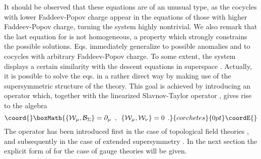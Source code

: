 \documentclass[a4paper,12pt]{article}
\begin{document}
It should be observed that these equations are of an unusual type, as the
cocycles with lower Faddeev-Popov charge appear in the equations of those
with higher Faddeev-Popov charge, turning the system \myHighlight{$\left( \ref{sde}%
\right) $}\coordHE{} highly nontrivial. We also remark that the last equation for \coordHE{} is not homogeneous, a property which
strongly constrains the possible solutions. Eqs.\myHighlight{$\left( \ref{sde}\right) $}\coordHE{}
immediately generalize to possible anomalies and to cocycles with arbitrary
Faddeev-Popov charge. To some extent, the system \myHighlight{$\left( \ref{sde}\right) $}\coordHE{}
displays a certain similarity with the descent equations in \coordHE{} superspace 
\cite{sp}. Actually, it is possible to solve the eqs.\myHighlight{$\left( \ref{sde}%
\right) $}\coordHE{} in a rather direct way by making use of the supersymmetric
structure of the theory. This goal is achieved by introducing an operator \coordHE{} which, together with the linearized Slavnov-Taylor
operator \coordHE{}, gives rise to the algebra 
\[\coord{}\boxMath{
\left\{ \mathcal{W}_{\mu },\mathcal{B}_{\Sigma }\right\} =\partial _{\mu
}\,\,\,,\,\,\,\left\{ \mathcal{W}_{\mu },\mathcal{W}_{\nu }\right\} =0\,\;%
\mathrm{.}
}{corchetes}{0pt}\coordE{}\]
The operator \coordHE{} has been introduced first in the case of
topological field theories \cite{tp,tp1}, and subsequently in the case of
extended supersymmetry \cite{th,n41}. In the next section the explicit form
of \coordHE{} for the case of \coordHE{} gauge theories will be given.
\end{document}

